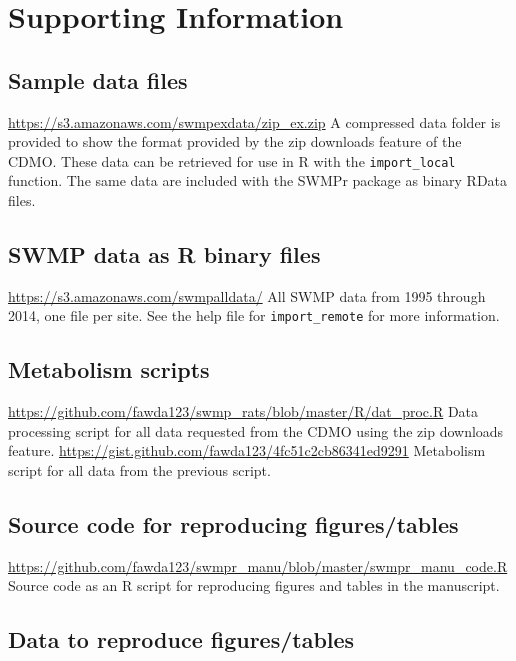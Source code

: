 \documentclass[10pt,letterpaper]{article}\usepackage[]{graphicx}\usepackage[]{color}
\begin{document}
\section*{Supporting Information}
\label{supp_info}

\subsection*{Sample data files}
\label{supp_zip}

\href{https://s3.amazonaws.com/swmpexdata/zip_ex.zip}{https://s3.amazonaws.com/swmpexdata/zip\_ex.zip} A compressed data folder is provided to show the format provided by the zip downloads feature of the \gls{CDMO}.  These data can be retrieved for use in R with the \texttt{import\_local} function.  The same data are included with the SWMPr package as binary RData files. 

\subsection*{\gls{SWMP} data as R binary files}

\href{https://s3.amazonaws.com/swmpalldata/}{https://s3.amazonaws.com/swmpalldata/} All \gls{SWMP} data from 1995 through 2014, one file per site. See the help file for \texttt{import\_remote} for more information.

\subsection*{Metabolism scripts}
\label{met_scripts}

\url{https://github.com/fawda123/swmp_rats/blob/master/R/dat_proc.R} Data processing script for all data requested from the CDMO using the zip downloads feature.
\url{https://gist.github.com/fawda123/4fc51c2cb86341ed9291} Metabolism script for all data from the previous script.

\subsection*{Source code for reproducing figures/tables}

\href{https://github.com/fawda123/swmpr_manu/blob/master/swmpr_manu_code.R}{https://github.com/fawda123/swmpr\_manu/blob/master/swmpr\_manu\_code.R} Source code as an R script for reproducing figures and tables in the manuscript.

\subsection*{Data to reproduce figures/tables}
\end{document}
